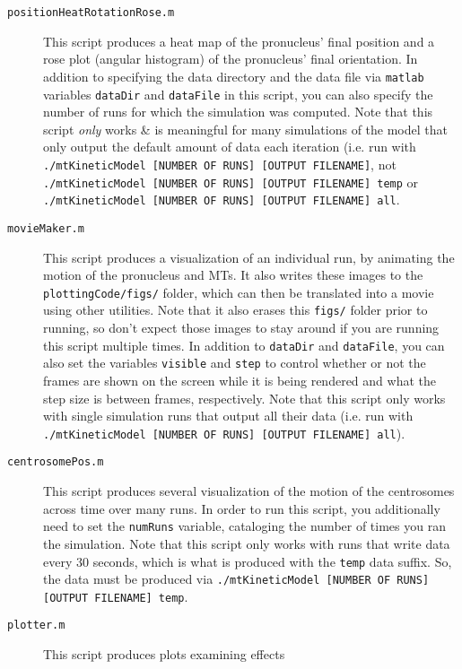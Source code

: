 \documentclass{article}
\begin{document}
  \begin{description}
    \item[\texttt{positionHeatRotationRose.m}] This script produces a heat map
      of the pronucleus' final position and a rose plot (angular histogram) of
      the pronucleus' final orientation. In addition to specifying the data
      directory and the data file via \texttt{matlab} variables \texttt{dataDir}
      and \texttt{dataFile} in this script, you can also specify the number of
      runs for which the simulation was computed. Note that this script
      \emph{only} works \& is meaningful for many simulations of the model that
      only output the default amount of data each iteration (i.e. run with
      \texttt{./mtKineticModel [NUMBER OF RUNS] [OUTPUT FILENAME]}, not 
      \texttt{./mtKineticModel [NUMBER OF RUNS] [OUTPUT FILENAME] temp} or 
      \texttt{./mtKineticModel [NUMBER OF RUNS] [OUTPUT FILENAME] all}.
    \item[\texttt{movieMaker.m}] This script produces a visualization of an
      individual run, by animating the motion of the pronucleus and MTs. It also
      writes these images to the \texttt{plottingCode/figs/} folder, which can
      then be translated into a movie using other utilities. Note that it also
      erases this \texttt{figs/} folder prior to running, so don't expect those
      images to stay around if you are running this script multiple times. In
      addition to \texttt{dataDir} and \texttt{dataFile}, you can also set the
      variables \texttt{visible} and \texttt{step} to control whether or not the
      frames are shown on the screen while it is being rendered and what the
      step size is between frames, respectively. Note that this script only
      works with single simulation runs that output all their data (i.e. run
      with \texttt{./mtKineticModel [NUMBER OF RUNS] [OUTPUT FILENAME] all}).
    \item[\texttt{centrosomePos.m}] This script produces several visualization
      of the motion of the centrosomes across time over many runs. In order to
      run this script, you additionally need to set the \texttt{numRuns}
      variable, cataloging the number of times you ran the simulation. Note that
      this script only works with runs that write data every $30$ seconds, which
      is what is produced with the \texttt{temp} data suffix. So, the data must
      be produced via
      \texttt{./mtKineticModel [NUMBER OF RUNS] [OUTPUT FILENAME] temp}.
    \item[\texttt{plotter.m}] This script produces plots examining effects

\end{description}
\end{document}
